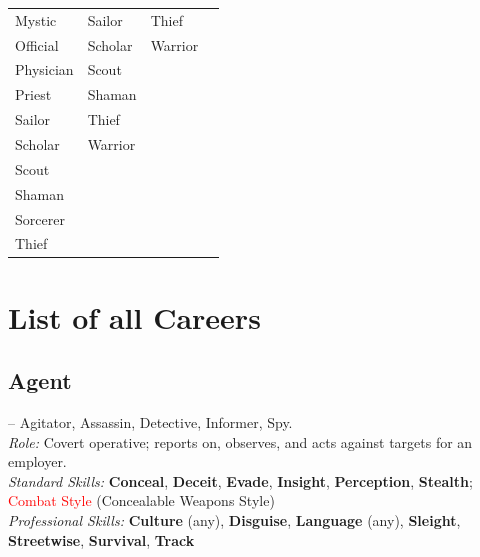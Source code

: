 \documentclass[10pt]{article}
\newcommand{\skill}[1]{\textbf{#1}}
\begin{document}
\begin{table}[h!]
\begin{tabular}{|p{3cm}|p{3cm}|p{3cm}|p{3cm}|}
        Mystic             & Sailor             & Thief          &                    \\
        Official           & Scholar            & Warrior        &                    \\
        Physician          & Scout              &                &                    \\
        Priest             & Shaman             &                &                    \\
        Sailor             & Thief              &                &                    \\
        Scholar            & Warrior            &                &                    \\
        Scout              &                    &                &                    \\
        Shaman             &                    &                &                    \\
        Sorcerer           &                    &                &                    \\
        Thief              &                    &                &                    \\
        \hline
    \end{tabular}
\end{table}

\newpage
\section{List of all Careers}
\label{sec:all_careers}

\subsection*{Agent}
\label{career:agent}
 -- Agitator, Assassin, Detective, Informer, Spy.\\
\textit{Role:} Covert operative; reports on, observes, and acts against targets for an employer.\\
\textit{Standard Skills:} \skill{Conceal}, \skill{Deceit}, \skill{Evade}, \skill{Insight}, \skill{Perception}, \skill{Stealth}; \textcolor{red}{Combat Style} (Concealable Weapons Style)\\
\textit{Professional Skills:} \skill{Culture} (any), \skill{Disguise}, \skill{Language} (any), \skill{Sleight}, \skill{Streetwise}, \skill{Survival}, \skill{Track}

\vspace{0.2cm}
\end{document}
